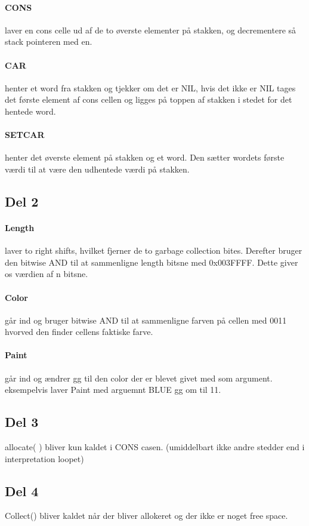 	\paragraph{CONS} laver en cons celle ud af de to øverste elementer på stakken, og decrementere så stack pointeren med en.
	\paragraph{CAR} henter et word fra stakken og tjekker om det er NIL, hvis det ikke er NIL tages det første element af cons cellen og ligges på toppen af stakken i stedet for det hentede word.
	\paragraph{SETCAR} henter det øverste element på stakken og et word. Den sætter wordets første værdi til at være den udhentede værdi på stakken.

\subsection{Del 2}
\label{O1_2}
	\paragraph{Length} laver to right shifts, hvilket fjerner de to garbage collection bites. Derefter bruger den bitwise AND til at sammenligne length bitsne med 0x003FFFF. Dette giver os værdien af n bitsne.
	\paragraph{Color} går ind og bruger bitwise AND til at sammenligne farven på cellen med 0011 hvorved den finder cellens faktiske farve.
	\paragraph{Paint} går ind og ændrer gg til den color der er blevet givet med som argument. eksempelvis laver Paint med arguemnt BLUE gg om til 11.

\subsection{Del 3}
\label{O1_3}
allocate( ) bliver kun kaldet i CONS casen.  (umiddelbart ikke andre stedder end i interpretation loopet)

\subsection{Del 4}
\label{O1_4}
Collect() bliver kaldet når der bliver allokeret og der ikke er noget free space.

